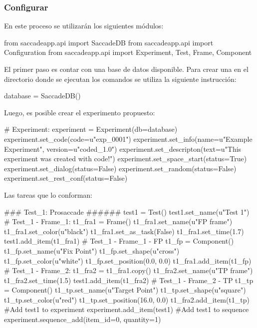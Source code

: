 \documentclass[\main/main.tex]{subfiles}
\begin{document}
            \subsubsection{Configurar}
                En este proceso se utilizarán los siguientes módulos:
\begin{singlespace}\begin{python}
from saccadeapp.api import SaccadeDB
from saccadeapp.api import Configuration
from saccadeapp.api import Experiment, Test, Frame, Component
\end{python}\end{singlespace}

                El primer paso es contar con una base de datos disponible. Para crear una en el directorio donde se ejecutan los comandos se utiliza la siguiente instrucción: 
\begin{singlespace}\begin{python}
database = SaccadeDB()
\end{python}\end{singlespace}
        
                Luego, es posible crear el experimento propuesto:
\begin{singlespace}\begin{python}
# Experiment:
experiment = Experiment(db=database)
experiment.set_code(code=u"exp_0001")
experiment.set_info(name=u"Example Experiment", version=u"coded_1.0")
experiment.set_descripton(text=u"This experiment was created with code!")
experiment.set_space_start(status=True)
experiment.set_dialog(status=False)
experiment.set_random(status=False)
experiment.set_rest_conf(status=False)
\end{python}\end{singlespace}

                Las tareas que lo conforman:
\begin{singlespace}\begin{python}
### Test_1: Prosaccade ######
test1 = Test()
test1.set_name(u"Test 1")
# Test_1 - Frame_1: 
t1_fra1 = Frame()
t1_fra1.set_name(u"FP frame")
t1_fra1.set_color(u"black")
t1_fra1.set_as_task(False)
t1_fra1.set_time(1.7)
test1.add_item(t1_fra1)
# Test_1 - Frame_1 - FP
t1_fp = Component()
t1_fp.set_name(u"Fix Point")
t1_fp.set_shape(u"cross")
t1_fp.set_color(u"white")
t1_fp.set_position(0.0, 0.0)
t1_fra1.add_item(t1_fp)
# Test_1 - Frame_2:
t1_fra2 = t1_fra1.copy()
t1_fra2.set_name(u"TP frame")
t1_fra2.set_time(1.5)
test1.add_item(t1_fra2)
# Test_1 - Frame_2 - TP
t1_tp = Component()
t1_tp.set_name(u"Target Point")
t1_tp.set_shape(u"square")
t1_tp.set_color(u"red")
t1_tp.set_position(16.0, 0.0)
t1_fra2.add_item(t1_tp)
#Add test1 to experiment
experiment.add_item(test1)
#Add test1 to sequence
experiment.sequence_add(item_id=0, quantity=1)
\end{python}\end{singlespace}
\end{document}
